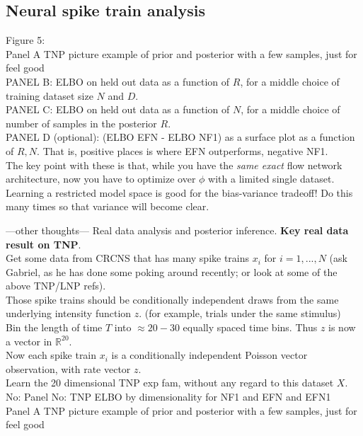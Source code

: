 \documentclass{article}
\begin{document}
\subsection{Neural spike train analysis}

Figure 5: \\
Panel A TNP picture example of prior and posterior with a few samples, just for feel good  \\
PANEL B: ELBO on held out data as a function of $R$, for a middle choice of training dataset size $N$ and $D$. \\ 
PANEL C: ELBO on held out data as a function of $N$, for a middle choice of number of samples in the posterior $R$. \\


PANEL D (optional): (ELBO EFN - ELBO NF1) as a surface plot as a function of $R,N$.  That is, positive places is where EFN outperforms, negative NF1. \\  
The key point with these is that, while you have the \emph{same exact} flow network architecture, now you have to optimize over $\phi$ with a limited single dataset.  Learning a restricted model space is good for the bias-variance tradeoff!  Do this many times so that variance will become clear.  


---other thoughts---
Real data analysis and posterior inference.  {\bf Key real data result on TNP}.  \\
Get some data from CRCNS that has many spike trains $x_i$ for $i=1,...,N$ (ask Gabriel, as he has done some poking around recently; or look at some of the above TNP/LNP refs). \\
Those spike trains should be conditionally independent draws from the same underlying intensity function $z$.  (for example, trials under the same stimulus)\\
Bin the length of time $T$ into $\approx 20-30$ equally spaced time bins.  Thus $z$ is now a vector in $\mathbb{R}^20$. \\
Now each spike train $x_i$ is a conditionally independent Poisson vector observation, with rate vector $z$.\\
Learn the 20 dimensional TNP exp fam, without any regard to this dataset $X$. \\
No: Panel No: TNP ELBO by dimensionality for NF1 and EFN and EFN1 \\
Panel A TNP picture example of prior and posterior with a few samples, just for feel good  \\
\end{document}
